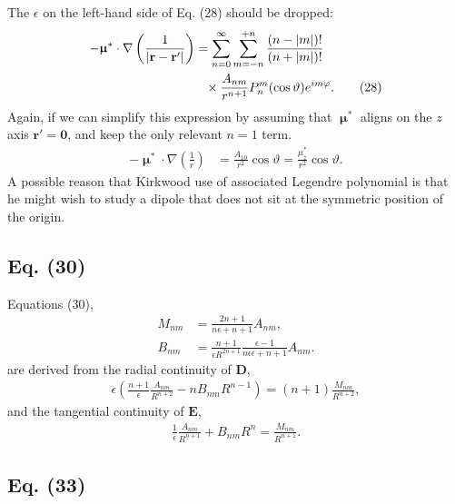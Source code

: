 \documentclass[11pt]{article}
\newcommand{\vct}[1]{\boldsymbol{\mathbf{#1}}}
\newcommand{\vr}{\vct{r}}
\newcommand{\vmu}{\vct{\upmu}}
\begin{document}
The $\epsilon$ on the left-hand side of Eq. (28)
should be dropped:
\begin{align}
  -\vct\upmu^*\cdot
  \nabla
  \left(
    \frac { 1 }
    { |\vr - \vr'| }
  \right)
&=
  \sum_{n = 0}^\infty
  \sum_{m = -n}^{+n}
  \frac { ( n - |m| )! } { ( n + |m| )! }
  \notag
  \\
&\hphantom{=}\times
  \frac { A_{nm} } { r^{n + 1} }
  P_n^m(\cos\vartheta) e^{im \varphi}.
  \tag{28}
\end{align}
%
Again, if we can simplify this expression
by assuming that $\vmu^*$ aligns on the $z$ axis
$\vr' = \vct 0$, and keep the only relevant $n = 1$ term.
%
\begin{align}
  -\vct\upmu^*\cdot
  \nabla
  \left(
    \frac { 1 }
    { r }
  \right)
&=
  \frac { A_{10} } { r^2 }
  \cos\vartheta
=
  \frac { \mu_z^* } { r^2 }
  \cos\vartheta.
  \tag{$28''$}
\end{align}
%
A possible reason that Kirkwood use
of associated Legendre polynomial
is that he might wish to study a dipole
that does not sit at the symmetric position of the origin.



\subsection{Eq. (30)}



Equations (30),
\begin{equation}
\begin{split}
  M_{nm}
&=
  \frac{ 2 n + 1 } { n \epsilon + n + 1 } A_{nm},
\\
  B_{nm}
&=
  \frac{ n + 1 }{ \epsilon R^{2 n + 1} }
  \frac{ \epsilon - 1 } { n \epsilon \epsilon + n + 1 }
  A_{nm}.
\end{split}
  \tag{30}
\end{equation}
%
are derived from the radial continuity of $\vct D$,
%
\begin{align*}
  \epsilon
  \left(
    \frac { n + 1 }{ \epsilon }
    \frac { A_{nm} } { R^{n+2} }
  - n B_{nm} R^{n - 1}
  \right)
=
  (n + 1) \frac{ M_{nm} }{ R^{n+2} },
\end{align*}
and the tangential continuity of $\vct E$,
\begin{align*}
  \frac { 1 }{ \epsilon }
  \frac { A_{nm} } { R^{n+1} }
+
  B_{nm} R^n
=
  \frac{ M_{nm} }{ R^{n+1} }.
\end{align*}



\subsection{Eq. (33)}
\end{document}
